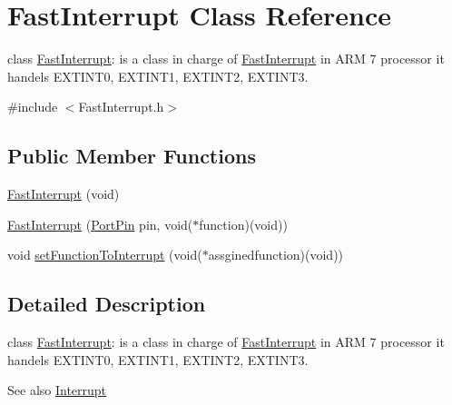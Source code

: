\hypertarget{class_fast_interrupt}{
\section{FastInterrupt Class Reference}
\label{class_fast_interrupt}
}


class \hyperlink{class_fast_interrupt}{FastInterrupt}: is a class in charge of \hyperlink{class_fast_interrupt}{FastInterrupt} in ARM 7 processor it handels EXTINT0, EXTINT1, EXTINT2, EXTINT3.  




{\ttfamily \#include $<$FastInterrupt.h$>$}

\subsection*{Public Member Functions}
\begin{DoxyCompactItemize}
\item 
\hyperlink{class_fast_interrupt_a71047e74a5999eef5e462ac48cea7ab7}{FastInterrupt} (void)
\item 
\hyperlink{group__group11_ga1cd10c91ae081005e8cd4663ff33f230}{FastInterrupt} (\hyperlink{class_port_pin}{PortPin} pin, void($\ast$function)(void))
\item 
void \hyperlink{group__group11_gab84661ddc77f64481ee9d389aa01ea46}{setFunctionToInterrupt} (void($\ast$assginedfunction)(void))
\end{DoxyCompactItemize}


\subsection{Detailed Description}
class \hyperlink{class_fast_interrupt}{FastInterrupt}: is a class in charge of \hyperlink{class_fast_interrupt}{FastInterrupt} in ARM 7 processor it handels EXTINT0, EXTINT1, EXTINT2, EXTINT3. 

\begin{DoxySeeAlso}{See also}
\hyperlink{class_interrupt}{Interrupt} 
\end{DoxySeeAlso}


